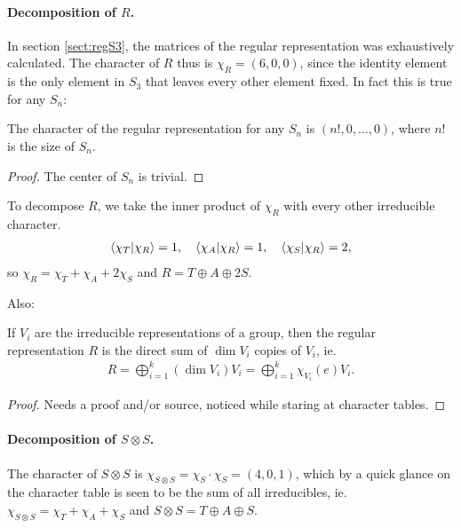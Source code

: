 \paragraph{Decomposition of $R$.} In section \ref{sect:regS3}, the matrices of the regular representation was exhaustively calculated. The character of $R$ thus is $\chi_R = (6,0,0)$, since the identity element is the only element in $S_3$ that leaves every other element fixed. In fact this is true for any $S_n$:
\begin{theorem}\label{thm:charregSn}
	 The character of the regular representation for any $S_n$ is $(n!, 0, \dots, 0)$, where $n!$ is the size of $S_n$.
\end{theorem}
\begin{proof}
	The center of $S_n$ is trivial.
\end{proof}

To decompose $R$, we take the inner product of $\chi_R$ with every other irreducible character.
\begin{align}
	\bra{\chi_T}\ket{\chi_R} = 1, \quad
	\bra{\chi_A}\ket{\chi_R} = 1, \quad
	\bra{\chi_S}\ket{\chi_R} = 2, 
\end{align}
so $\chi_R = \chi_T + \chi_A + 2\chi_S$ and $R = T \oplus A \oplus 2S$.

Also:
\begin{theorem}
	If $V_i$ are the irreducible representations of a group, then the regular representation $R$ is the direct sum of $\dim V_i$ copies of $V_i$, ie. 
	\begin{align}
		R = \bigoplus_{i=1}^{k} (\dim V_i)V_i = \bigoplus_{i=1}^{k} \chi_{V_i}(e)V_i .
	\end{align}
\end{theorem}
\begin{proof}
	Needs a proof and/or source, noticed while staring at character tables.
\end{proof}

\paragraph{Decomposition of $S \otimes S$.} The character of $S \otimes S$ is $\chi_{S \otimes S} = \chi_S \cdot \chi_S = (4,0,1)$, which by a quick glance on the character table is seen to be the sum of all irreducibles, ie. $\chi_{S \otimes S} = \chi_T + \chi_A + \chi_S$ and $S \otimes S = T \oplus A \oplus S$.

